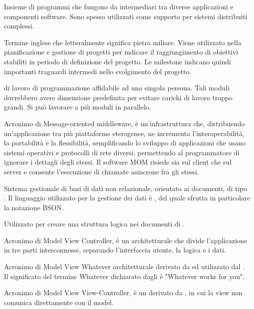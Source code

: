 Insieme di programmi che fungono da intermediari tra diverse applicazioni e componenti software. Sono spesso utilizzati come supporto per sistemi distribuiti complessi.

Termine inglese che letteralmente significa pietra miliare. Viene utilizzato nella pianificazione e gestione di progetti per indicare il raggiungimento di obiettivi stabiliti in periodo di definizione del progetto. 
Le milestone indicano quindi importanti traguardi intermedi nello svolgimento del progetto.

 di lavoro di programmazione affidabile ad una singola persona. Tali moduli dovrebbero avere dimensione predefinita per evitare carichi di lavoro troppo grandi. Si può lavorare a più moduli in parallelo.

Acronimo di Message-oriented middleware, è un'infrastruttura  che, distribuendo un'applicazione tra più piattaforme eterogenee, ne incrementa l'interoperabilità, la portabilità e la flessibilità, semplificando lo sviluppo di applicazioni che usano sistemi operativi e protocolli di rete diversi, permettendo al programmatore di ignorare i dettagli degli stessi.
Il software MOM risiede sia sul client che sul server e consente l'esecuzione di chiamate asincrone fra gli stessi.

Sistema gestionale di basi di dati non relazionale, orientato ai documenti, di tipo . Il linguaggio utilizzato per la gestione dei dati è , del quale sfrutta in particolare la notazione BSON.

Utilizzato per creare una struttura logica nei documenti di .

Acronimo di Model View Controller, è un  architetturale che divide l'applicazione in tre parti interconnesse, separando l'interfaccia utente, la logica e i dati.

Acronimo di Model View Whatever   architetturale derivato da  ed utilizzato dal  .
Il significato del termine Whatever dichiarato dagli  è "Whatever works for you".

Acronimo di Model View View-Controller, è un  derivato da , in cui la view non comunica direttamente con il model.

